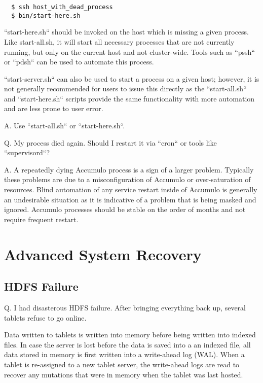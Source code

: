 \begingroup\fontsize{8pt}{8pt}\selectfont\begin{verbatim}
  $ ssh host_with_dead_process
  $ bin/start-here.sh
\end{verbatim}\endgroup

``start-here.sh`` should be invoked on the host which is missing a given process. Like start-all.sh, it will start all
necessary processes that are not currently running, but only on the current host and not cluster-wide. Tools such as ``pssh`` or 
``pdsh`` can be used to automate this process.

``start-server.sh`` can also be used to start a process on a given host; however, it is not generally recommended for
users to issue this directly as the ``start-all.sh`` and ``start-here.sh`` scripts provide the same functionality with
more automation and are less prone to user error.

A. Use ``start-all.sh`` or ``start-here.sh``.

Q. My process died again. Should I restart it via ``cron`` or tools like ``supervisord``?

A. A repeatedly dying Accumulo process is a sign of a larger problem. Typically these problems are due to a
misconfiguration of Accumulo or over-saturation of resources. Blind automation of any service restart inside of Accumulo
is generally an undesirable situation as it is indicative of a problem that is being masked and ignored. Accumulo
processes should be stable on the order of months and not require frequent restart.


\section{Advanced System Recovery}

\subsection{HDFS Failure}
Q. I had disasterous HDFS failure.  After bringing everything back up, several tablets refuse to go online.

Data written to tablets is written into memory before being written into indexed files.  In case the server
is lost before the data is saved into a an indexed file, all data stored in memory is first written into a
write-ahead log (WAL).  When a tablet is re-assigned to a new tablet server, the write-ahead logs are read to
recover any mutations that were in memory when the tablet was last hosted.

